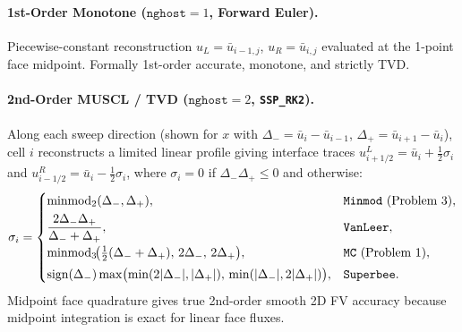 \documentclass[11pt,a4paper]{article}
\theoremstyle{definition}
\newcommand{\code}[1]{\texttt{#1}}
\begin{document}
\paragraph{1st-Order Monotone ($\code{nghost}=1$, Forward Euler).}
Piecewise-constant reconstruction $u_L = \bar{u}_{i-1,j}$, $u_R = \bar{u}_{i,j}$ evaluated at the 1-point face midpoint. Formally 1st-order accurate, monotone, and strictly TVD.

\paragraph{2nd-Order MUSCL / TVD ($\code{nghost}=2$, \code{SSP\_RK2}).}
Along each sweep direction (shown for $x$ with $\Delta_- = \bar{u}_i - \bar{u}_{i-1}$, $\Delta_+ = \bar{u}_{i+1} - \bar{u}_i$), cell $i$ reconstructs a limited linear profile giving interface traces $u_{i+1/2}^L = \bar{u}_i + \frac{1}{2}\sigma_i$ and $u_{i-1/2}^R = \bar{u}_i - \frac{1}{2}\sigma_i$, where $\sigma_i = 0$ if $\Delta_-\Delta_+ \le 0$ and otherwise:
\[
\sigma_i =
\begin{cases}
\operatorname{minmod}_2(\Delta_-, \Delta_+), & \text{\code{Minmod} (Problem 3)},\\[3pt]
\dfrac{2\Delta_-\Delta_+}{\Delta_- + \Delta_+}, & \text{\code{VanLeer}},\\[6pt]
\operatorname{minmod}_3\!\bigl(\tfrac{1}{2}(\Delta_-+\Delta_+),\, 2\Delta_-,\, 2\Delta_+\bigr), & \text{\code{MC} (Problem 1)},\\[3pt]
\operatorname{sign}(\Delta_-)\max\bigl(\min(2|\Delta_-|,|\Delta_+|),\,\min(|\Delta_-|,2|\Delta_+|)\bigr), & \text{\code{Superbee}}.
\end{cases}
\]
Midpoint face quadrature gives true 2nd-order smooth 2D FV accuracy because midpoint integration is exact for linear face fluxes.
\end{document}
